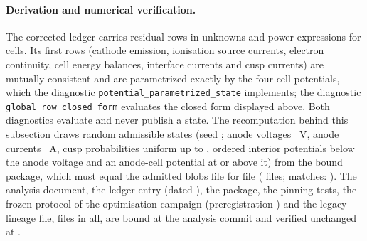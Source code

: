 \paragraph{Derivation and numerical verification.}
The corrected ledger carries \FccRowCount{} residual rows in \FccStateDimension{}
unknowns and \FccPowerExpressionCount{} power expressions for \FccCellCount{} cells.
Its first \FccGlobalRowIndex{} rows (cathode emission, ionisation source currents,
electron continuity, cell energy balances, interface currents and cusp currents) are
mutually consistent and are parametrized exactly by the four cell potentials, which
the diagnostic \texttt{potential\_parametrized\_state} implements; the diagnostic
\texttt{global\_row\_closed\_form} evaluates the closed form displayed above. Both
diagnostics evaluate and never publish a state. The recomputation behind this
subsection draws \FccClosedFormSamples{} random admissible states (seed
\FccClosedFormSeed; anode voltages \FccSampleVoltages{}~V, anode currents
\FccSampleCurrents{}~A, cusp probabilities uniform up to \FccSampleProbabilityUpper,
ordered interior potentials below the anode voltage and an anode-cell potential at or
above it) from the bound package, which must equal the admitted blobs file for file
(\FccPackageFileCount{} files; matches: \FccPackageMatches). The analysis document,
the ledger entry (dated \FccAnalysisDate), the package, the pinning tests, the frozen
protocol of the optimisation campaign (preregistration \texttt{\FccMdoPreregCommit})
and the legacy lineage file, \FccBoundFileCount{} files in all, are bound at the
analysis commit \texttt{\FccAnalysisCommit} and verified unchanged at
\texttt{\FccVerifiedTreeCommit}.

